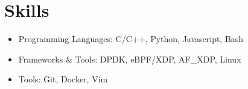 \section{Skills}
\begin{itemize}[noitemsep,topsep=0pt,parsep=0pt,partopsep=0pt]
	\item {Programming Languages: C/C++, Python, Javascript, Bash}
	\item {Frameworks \& Tools: DPDK, eBPF/XDP, AF\_XDP, Linux}
    \item {Tools: Git, Docker, Vim}
\end{itemize}




